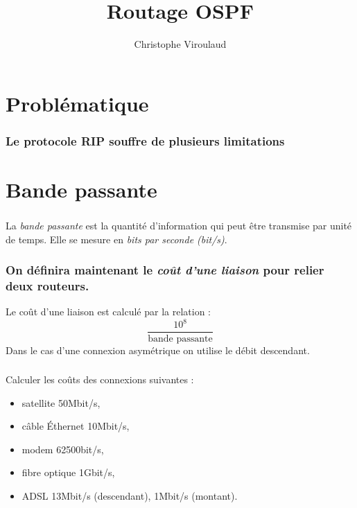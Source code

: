 \documentclass[svgnames,11pt]{beamer}
\author[]{Christophe Viroulaud}
\title{Routage OSPF}
\date{}
\institute{Terminale NSI}
\begin{document}
\begin{frame}
    \titlepage
\end{frame}

\section{Problématique}
\begin{frame}
    \frametitle{Le protocole RIP souffre de plusieurs limitations}

    \begin{center}
    \end{center}

\end{frame}

\section{Bande passante}

\begin{frame}
    \frametitle{}

    \begin{aretenir}[]
        La \emph{bande passante} est la quantité d'information qui peut être transmise par unité de temps. Elle se mesure en \emph{bits par seconde (bit/s)}.
    \end{aretenir}

\end{frame}

\begin{frame}
    \frametitle{ On définira maintenant le \emph{coût d'une liaison} pour relier deux routeurs.}

    \begin{aretenir}[]
        Le coût d'une liaison est calculé par la relation :
        $$\dfrac{10^8}{\mbox{bande passante}}$$
        Dans le cas d'une connexion asymétrique on utilise le débit descendant.
    \end{aretenir}
\end{frame}


\begin{frame}
    \frametitle{}

    \begin{activite}
        Calculer les coûts des connexions suivantes :
        \begin{itemize}
            \item satellite 50Mbit/s,
            \item câble Éthernet 10Mbit/s,
            \item modem 62500bit/s,
            \item fibre optique 1Gbit/s,
            \item ADSL 13Mbit/s (descendant), 1Mbit/s (montant).
        \end{itemize}
    \end{activite}

\end{frame}
\end{document}
